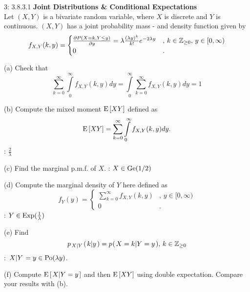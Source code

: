 \documentclass[a4paper,twoside=false,abstract=false,numbers=noenddot,
titlepage=false,headings=small,parskip=half,version=last]{scrartcl}
\begin{document}
\begin{exercise}{3: 3.8.3.1}
    \textbf{Joint Distributions \& Conditional Expectations} \\
    Let $(X, Y)$ is a bivariate random variable, where $X$ is discrete and $Y$
    is continuous. $(X, Y)$ has a joint probability mass - and density function
    given by
    \begin{equation}
        f_{X,Y}(k, y) = \begin{cases}
            \frac{\partial{P(X=k, Y\le y)}}{\partial{y}} =
            \lambda\frac{(\lambda y)^k}{k!}e^{-2\lambda y}
                    &,\, k\in\mathbb{Z}_{\ge 0},\, y\in [0, \infty) \\
            0       &.
        \end{cases}
    \end{equation}

    (a) Check that
    \begin{equation}
        \sum\limits_{k=0}^\infty \int\limits_0^\infty f_{X,Y}(k,y)dy =
        \int\limits_0^\infty \sum\limits_{k=0}^\infty f_{X,Y}(k,y)dy = 1
    \end{equation}

    (b) Compute the mixed moment ${\rm E}\,[XY]$ defined as
    \begin{equation}
        {\rm E}\,[XY] =
        \sum\limits_{k=0}^\infty \int\limits_0^\infty f_{X,Y}(k,y)dy.
    \end{equation}
    \Answer: $\frac{2}{\lambda}$

    (c) Find the marginal p.m.f. of $X$.
    \Answer: $X\in\text{Ge}(1/2)$

    (d) Compute the marginal density of $Y$ here defined as
    \begin{equation}
        f_Y(y) = \begin{cases}
            \sum\limits_{k=0}^\infty f_{X,Y}(k,y) &, \, y\in[0,\infty) \\
             0                                    &.
        \end{cases}
    \end{equation}
    \Answer: $Y\in\text{Exp}(\frac{1}{\lambda})$

    (e) Find
    \begin{equation}
        p_{\left. X \middle\vert Y \right.} (\left. k \middle\vert y \right.) =
        p_{} (\left. X=k \middle\vert Y=y \right.), \, k\in\mathbb{Z}_{\ge 0}
    \end{equation}
    \Answer: $\left. X \middle\vert Y \right. = y\in\text{Po}(\lambda y)$.

    (f) Compute ${\rm E}\,[\left. X \middle\vert Y=y \right.]$ and then ${\rm E}\,[XY]$ using
    double expectation. Compare your results with (b).
\end{exercise}
\begin{solution}
\end{solution}
\pagebreak
\end{document}
